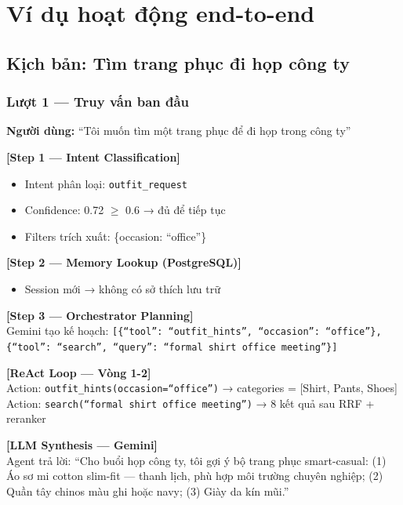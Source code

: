 \documentclass[12pt,a4paper]{report}
\begin{document}
\chapter{Ví dụ hoạt động end-to-end}

\section{Kịch bản: Tìm trang phục đi họp công ty}

\subsection{Lượt 1 --- Truy vấn ban đầu}

\begin{tcolorbox}[title=Diễn biến Lượt 1]
\textbf{Người dùng:} ``Tôi muốn tìm một trang phục để đi họp trong công ty''

\textbf{[Step 1 --- Intent Classification]}
\begin{itemize}
    \item Intent phân loại: \texttt{outfit\_request}
    \item Confidence: 0.72 $\geq$ 0.6 → đủ để tiếp tục
    \item Filters trích xuất: \{occasion: ``office''\}
\end{itemize}

\textbf{[Step 2 --- Memory Lookup (PostgreSQL)]}
\begin{itemize}
    \item Session mới → không có sở thích lưu trữ
\end{itemize}

\textbf{[Step 3 --- Orchestrator Planning]}\\
Gemini tạo kế hoạch:
\texttt{[\{``tool'': ``outfit\_hints'', ``occasion'': ``office''\}, \{``tool'': ``search'', ``query'': ``formal shirt office meeting''\}]}

\textbf{[ReAct Loop --- Vòng 1-2]}\\
Action: \texttt{outfit\_hints(occasion=``office'')} → categories = [Shirt, Pants, Shoes]\\
Action: \texttt{search(``formal shirt office meeting'')} → 8 kết quả sau RRF + reranker

\textbf{[LLM Synthesis --- Gemini]}\\
Agent trả lời: ``Cho buổi họp công ty, tôi gợi ý bộ trang phục smart-casual: (1) Áo sơ mi cotton slim-fit --- thanh lịch, phù hợp môi trường chuyên nghiệp; (2) Quần tây chinos màu ghi hoặc navy; (3) Giày da kín mũi.''
\end{tcolorbox}
\end{document}
